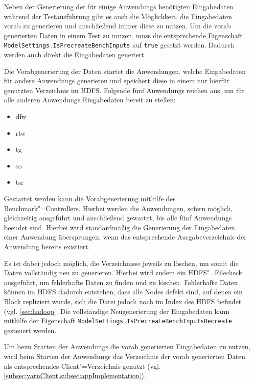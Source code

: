 Neben der Generierung der für einige \glspl{Anwendung} benötigten Eingabedaten während der Testausführung gibt es auch die Möglichkeit, die Eingabedaten vorab zu generieren und anschließend immer diese zu nutzen.
Um die vorab generierten Daten in einem \gls{Test} zu nutzen, muss die entsprechende Eigenschaft \texttt{ModelSettings.IsPrecreateBenchInputs} auf \texttt{true} gesetzt werden.
Dadurch werden auch direkt die Eingabedaten generiert.

Die Vorabgenerierung der Daten startet die Anwendungen, welche Eingabedaten für andere \glspl{Anwendung} generieren und speichert diese in einem nur hierfür genutzten Verzeichnis im \gls{HDFS}.
Folgende fünf \glspl{Anwendung} reichen aus, um für alle anderen \glspl{Anwendung} Eingabedaten bereit zu stellen:

\begin{itemize}
    \item \acrlong{dfw}
    \item \acrlong{rtw}
    \item \acrlong{tg}
    \item \acrlong{so}
    \item \acrlong{tsr}
\end{itemize}

Gestartet werden kann die Vorabgenerierung mithilfe des Benchmark"=Controllers.
Hierbei werden die Anwendungen, sofern möglich, gleichzeitig ausgeführt und anschließend gewartet, bis alle fünf \glspl{Anwendung} beendet sind.
Hierbei wird standardmäßig die Generierung der Eingabedaten einer \gls{Anwendung} übersprungen, wenn das entsprechende Ausgabeverzeichnis der \gls{Anwendung} bereits existiert.

Es ist dabei jedoch möglich, die Verzeichnisse jeweils zu löschen, um somit die Daten vollständig neu zu generieren.
Hierbei wird zudem ein \gls{HDFS}"=Filecheck ausgeführt, um fehlerhafte Daten zu finden und zu löschen.
Fehlerhafte Daten können im \gls{HDFS} \zB dadurch entstehen, dass alle Nodes defekt sind, auf denen ein Block repliziert wurde, sich die Datei jedoch noch im Index des \gls{HDFS} befindet (vgl. \cref{sec:hadoop}.
Die vollständige Neugenerierung der Eingabedaten kann mithilfe der Eigenschaft \texttt{ModelSettings.IsPrecreateBenchInputsRecreate} gesteuert werden.

Um beim Starten der \glspl{Anwendung} die vorab generierten Eingabedaten zu nutzen, wird beim Starten der \glspl{Anwendung} das Verzeichnis der vorab generierten Daten als entsprechendes Client"=Verzeichnis genutzt (vgl. \cref{subsec:yarnClient,subsec:appImplementation}).

